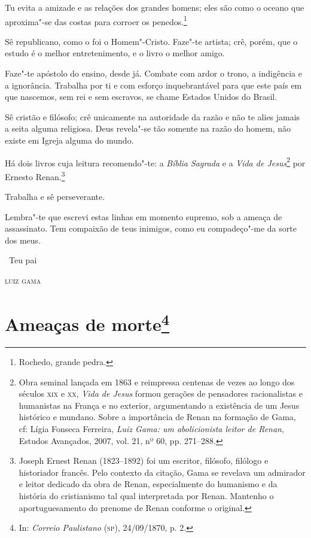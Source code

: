 Tu evita a amizade e as relações dos grandes homens; eles são como o
oceano que aproxima"-se das costas para corroer os penedos.\footnote{
  Rochedo, grande pedra.}

Sê republicano, como o foi o Homem"-Cristo. Faze"-te artista; crê, porém,
que o estudo é o melhor entretenimento, e o livro o melhor amigo.

Faze"-te apóstolo do ensino, desde já. Combate com ardor o trono, a
indigência e a ignorância. Trabalha por ti e com esforço inquebrantável
para que este país em que nascemos, sem rei e sem escravos, se chame
Estados Unidos do Brasil.

Sê cristão e filósofo; crê unicamente na autoridade da razão e não te
alies jamais a seita alguma religiosa. Deus revela"-se tão somente na
razão do homem, não existe em Igreja alguma do mundo.

Há dois livros cuja leitura recomendo"-te: a \emph{Bíblia Sagrada} e a
\emph{Vida de Jesus}\footnote{Obra seminal lançada em 1863 e
  reimpressa centenas de vezes ao longo dos séculos \textsc{xix} e \textsc{xx}, \emph{Vida
  de Jesus} formou gerações de pensadores racionalistas e humanistas na
  França e no exterior, argumentando a existência de um Jesus histórico
  e mundano. Sobre a importância de Renan na formação de Gama, cf: Lígia
  Fonseca Ferreira, \emph{Luiz Gama: um abolicionista leitor de Renan},
  Estudos Avançados, 2007, vol. 21, nº 60, pp. 271--288.} por Ernesto
Renan.\footnote{Joseph Ernest Renan (1823--1892) foi um escritor,
  filósofo, filólogo e historiador francês. Pelo contexto da citação,
  Gama se revelava um admirador e leitor dedicado da obra de Renan,
  especialmente do humanismo e da história do cristianismo tal qual
  interpretada por Renan. Mantenho o aportuguesamento do prenome de
  Renan conforme o original.}

Trabalha e sê perseverante.

Lembra"-te que escrevi estas linhas em momento supremo, sob a ameaça de
assassinato. Tem compaixão de teus inimigos, como eu compadeço"-me da
sorte dos meus.

\bigskip

\hfill\ Teu pai

\hfill\textsc{luiz gama}


\chapter{Ameaças de morte\footnote[*]{In: \emph{Correio Paulistano} (\textsc{sp}),
  24/09/1870, p. 2.}} %

